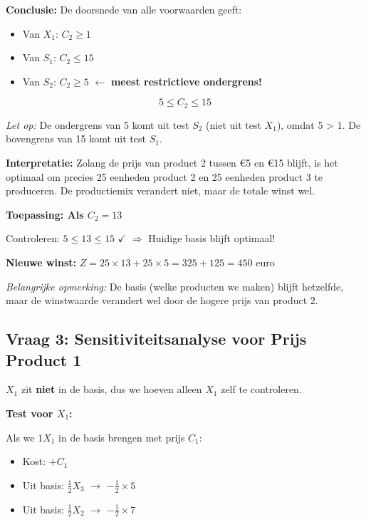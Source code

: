 \documentclass[a4paper,11pt]{article}
\begin{document}
\begin{oefenblok}[title=Productie Optimalisatie bij een Bedrijf]
\vspace{0.3cm}

\textbf{Conclusie:} De doorsnede van alle voorwaarden geeft:
\begin{itemize}
    \item Van $X_1$: $C_2 \geq 1$
    \item Van $S_1$: $C_2 \leq 15$
    \item Van $S_2$: $C_2 \geq 5$ \quad $\leftarrow$ \textbf{meest restrictieve ondergrens!}
\end{itemize}

$$\boxed{5 \leq C_2 \leq 15}$$

\textit{Let op:} De ondergrens van 5 komt uit test $S_2$ (niet uit test $X_1$), omdat 5 > 1. De bovengrens van 15 komt uit test $S_1$.

\textbf{Interpretatie:} Zolang de prijs van product 2 tussen €5 en €15 blijft, is het optimaal om precies 25 eenheden product 2 en 25 eenheden product 3 te produceren. De productiemix verandert niet, maar de totale winst wel.

\vspace{0.3cm}

\textbf{Toepassing: Als $C_2 = 13$}

Controleren: $5 \leq 13 \leq 15$ $\checkmark$ $\Rightarrow$ Huidige basis blijft optimaal!

\textbf{Nieuwe winst:} $Z = 25 \times 13 + 25 \times 5 = 325 + 125 = 450$ euro

\textit{Belangrijke opmerking:} De basis (welke producten we maken) blijft hetzelfde, maar de winstwaarde verandert wel door de hogere prijs van product 2.

\subsection*{Vraag 3: Sensitiviteitsanalyse voor Prijs Product 1}

$X_1$ zit \textbf{niet} in de basis, dus we hoeven alleen $X_1$ zelf te controleren.

\textbf{Test voor $X_1$:}

Als we $1 X_1$ in de basis brengen met prijs $C_1$:
\begin{itemize}
    \item Kost: $+C_1$
    \item Uit basis: $\frac{1}{2} X_3$ $\rightarrow$ $-\frac{1}{2} \times 5$
    \item Uit basis: $\frac{1}{2} X_2$ $\rightarrow$ $-\frac{1}{2} \times 7$
\end{itemize}


\end{oefenblok}
\end{document}
